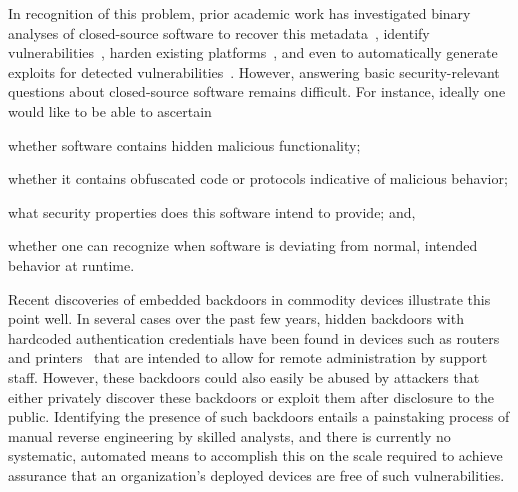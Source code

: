 \documentclass[letterpaper,twoside,11pt,headings=small]{scrartcl}
\begin{document}
In recognition of this problem, prior academic work has investigated binary
analyses of closed-source software to recover this
metadata~\cite{lee:ndss2011:tie}, identify vulnerabilities~\cite{kruegel:acsac2004:kernel}, harden existing
platforms~\cite{baliga:gibraltar,chipounov:asplos2011:s2e}, and even to automatically generate
exploits for detected vulnerabilities~\cite{kruegel:sec2005:mimicry,avgerinos:ndss2011:aeg,schwartz:sec2011:q,cha:oakland2012:mayhem}.
However, answering basic security-relevant questions about closed-source
software remains difficult.  For instance, ideally one would like to be
able to ascertain%
\begin{inparaenum}
    \item whether software contains hidden malicious functionality;
    \item whether it contains obfuscated code or protocols indicative of malicious behavior;
    \item what security properties does this software intend to provide; and,
    \item whether one can recognize when software is deviating from normal, intended behavior at runtime.
\end{inparaenum}

Recent discoveries of embedded backdoors in commodity devices illustrate this
point well.  In several cases over the past few years, hidden backdoors with
hardcoded authentication credentials have been found in devices such as
routers~\cite{heffner:dlink-dir100} and printers~\cite{cert:hp-backdoor} that
are intended to allow for remote administration by support staff.  However,
these backdoors could also easily be abused by attackers that either privately
discover these backdoors or exploit them after disclosure to the public.
Identifying the presence of such backdoors entails a painstaking process of
manual reverse engineering by skilled analysts, and there is currently no
systematic, automated means to accomplish this on the scale required to
achieve assurance that an organization's deployed devices are free of such
vulnerabilities.
\end{document}

